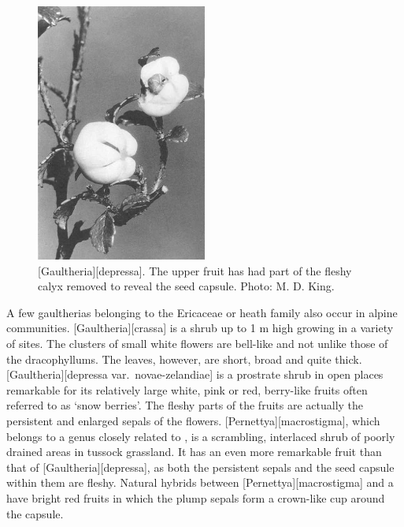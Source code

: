 \begin{figure}
	\includegraphics[width=0.5\textwidth]{graphics/figure94gaultheria.jpg}
	\centering
	\caption[\emph{Gaultheria depressa}]{[Gaultheria][depressa].
	The upper fruit has had part of the fleshy calyx removed to reveal the seed capsule.
	Photo: M. D. King.}%
	\label{fig:94gaultheria}
\end{figure}

A few gaultherias belonging to the Ericaceae or heath family also occur in alpine communities. [Gaultheria][crassa] is a shrub up to 1 m high growing in a variety of sites.
The clusters of small white flowers are bell-like and not unlike those of the dracophyllums.
The leaves, however, are short, broad and quite thick. [Gaultheria][depressa var.\ novae-zelandiae] is a prostrate shrub in open places remarkable for its relatively large white, pink or red, berry-like fruits often referred to as `snow berries'.
The fleshy parts of the fruits are actually the persistent and enlarged sepals of the flowers. [Pernettya][macrostigma], which belongs to a genus closely related to , is a scrambling, interlaced shrub of poorly drained areas in tussock grassland.
It has an even more remarkable fruit than that of [Gaultheria][depressa], as both the persistent sepals and the seed capsule within them are fleshy.
Natural hybrids between [Pernettya][macrostigma] and a  have bright red fruits in which the plump sepals form a crown-like cup around the capsule.

